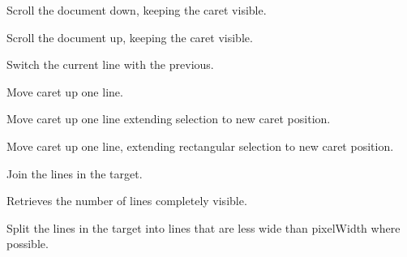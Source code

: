 
Scroll the document down, keeping the caret visible.


\label{wxstyledtextctrllinescrollup}


Scroll the document up, keeping the caret visible.


\label{wxstyledtextctrllinetranspose}


Switch the current line with the previous.


\label{wxstyledtextctrllineup}


Move caret up one line.


\label{wxstyledtextctrllineupextend}


Move caret up one line extending selection to new caret position.


\label{wxstyledtextctrllineuprectextend}


Move caret up one line, extending rectangular selection to new caret position.


\label{wxstyledtextctrllinesjoin}


Join the lines in the target.


\label{wxstyledtextctrllinesonscreen}


Retrieves the number of lines completely visible.


\label{wxstyledtextctrllinessplit}


Split the lines in the target into lines that are less wide than pixelWidth
where possible.


\label{wxstyledtextctrlloadfile}


